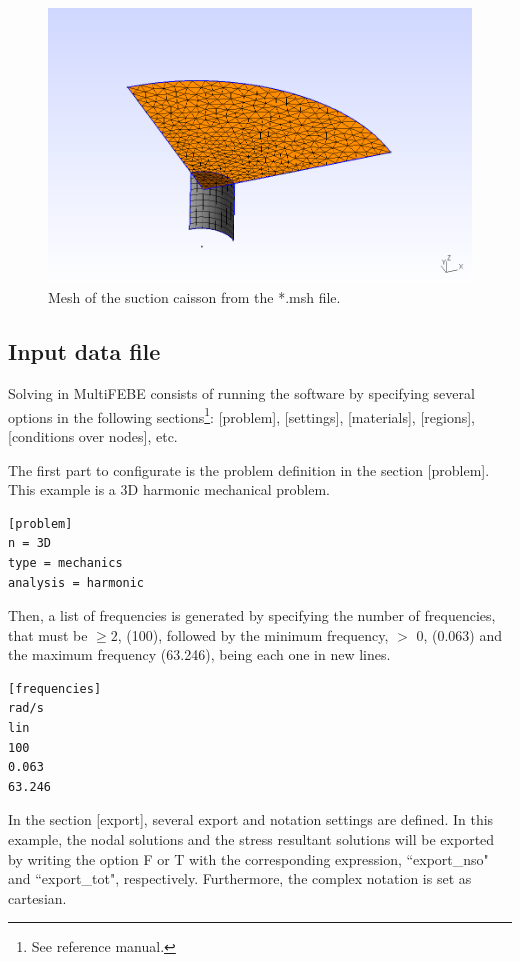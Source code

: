 \documentclass[a4]{article}
\begin{document}
\begin{figure}[tbh!]
	\centering
	\includegraphics[scale=0.6]{mesh.png}
	\caption{Mesh of the suction caisson from the *.msh file.}
	\label{fig:mesh}
\end{figure}

\subsection{Input data file}
Solving in MultiFEBE consists of running the software by specifying several options in the following sections\footnote{See reference manual.}: [problem], [settings], [materials], [regions], [conditions over nodes], etc.

The first part to configurate is the problem definition in the section [problem]. This example is a 3D harmonic mechanical problem.

\begin{Verbatim}	
[problem]
n = 3D
type = mechanics
analysis = harmonic
\end{Verbatim}

Then, a list of frequencies is generated by specifying the number of frequencies, that must be $\geq 2$, (100), followed by the minimum frequency, $>$ 0, (0.063) and the maximum frequency (63.246), being each one in new lines.

\begin{Verbatim}
[frequencies]
rad/s
lin
100
0.063
63.246
\end{Verbatim}


In the section [export], several export and notation settings are defined. In this example, the nodal solutions and the stress resultant solutions will be exported by writing the option F or T with the corresponding expression, ``export\_nso" and ``export\_tot", respectively. Furthermore, the complex notation is set as cartesian. 
\end{document}
